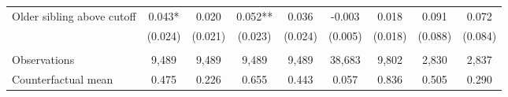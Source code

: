 {{\begin{tabular}{lcccccccc}
Older sibling above cutoff&       0.043*  &       0.020   &       0.052** &       0.036   &      -0.003   &       0.018   &       0.091   &       0.072   \\
                    &     (0.024)   &     (0.021)   &     (0.023)   &     (0.024)   &     (0.005)   &     (0.018)   &     (0.088)   &     (0.084)   \\
                    &               &               &               &               &               &               &               &               \\
Observations        &       9,489   &       9,489   &       9,489   &       9,489   &      38,683   &       9,802   &       2,830   &       2,837   \\
Counterfactual mean &       0.475   &       0.226   &       0.655   &       0.443   &       0.057   &       0.836   &       0.505   &       0.290   \\
 

\bottomrule
\end{tabular}
}
}
